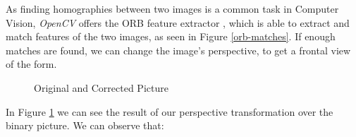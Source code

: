 \documentclass[11pt, a4paper]{report}
\begin{document}
As finding homographies between two images is a common task in Computer Vision, \textit{OpenCV} offers the ORB feature extractor \cite{rublee2011orb}, which is able to extract and match features of the two images, as seen in Figure \ref{orb-matches}. If enough matches are found, we can change the image's perspective, to get a frontal view of the form.

\begin{figure}[!h]
	\hfill
	\hfill
	\caption{Original and Corrected Picture}
	\label{parser-corrected-image}
\end{figure}

In Figure \ref{parser-corrected-image} we can see the result of our perspective transformation over the binary picture. We can observe that:
\end{document}
